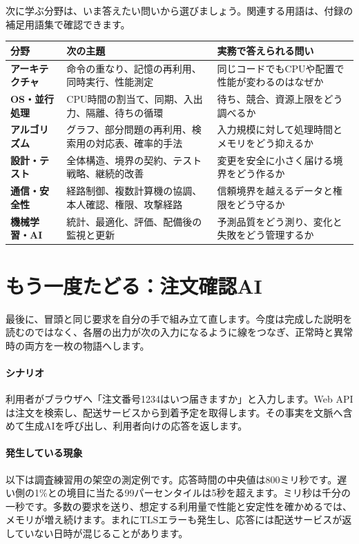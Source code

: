 次に学ぶ分野は、いま答えたい問いから選びましょう。関連する用語は、付録の補足用語集で確認できます。

\begingroup
  \noindent
  \begin{tabularx}{\textwidth}{@{}>{\bfseries}p{30mm}YY@{}}
    \toprule
    分野 & 次の主題 & 実務で答えられる問い \\
    \midrule
    アーキテクチャ & 命令の重なり、記憶の再利用、同時実行、性能測定 & 同じコードでもCPUや配置で性能が変わるのはなぜか \\
    OS・並行処理 & CPU時間の割当て、同期、入出力、隔離、待ちの循環 & 待ち、競合、資源上限をどう調べるか \\
    アルゴリズム & グラフ、部分問題の再利用、検索用の対応表、確率的手法 & 入力規模に対して処理時間とメモリをどう抑えるか \\
    設計・テスト & 全体構造、境界の契約、テスト戦略、継続的改善 & 変更を安全に小さく届ける境界をどう作るか \\
    通信・安全性 & 経路制御、複数計算機の協調、本人確認、権限、攻撃経路 & 信頼境界を越えるデータと権限をどう守るか \\
    機械学習・AI & 統計、最適化、評価、配備後の監視と更新 & 予測品質をどう測り、変化と失敗をどう管理するか \\
    \bottomrule
  \end{tabularx}
  \vspace{1mm}
\par
\endgroup


\section{もう一度たどる：注文確認AI}
\label{sec:07-practice-15}

最後に、冒頭と同じ要求を自分の手で組み立て直します。今度は完成した説明を読むのではなく、各層の出力が次の入力になるように線をつなぎ、正常時と異常時の両方を一枚の物語へします。

\begingroup
\begingroup
\paragraph{シナリオ}
        利用者がブラウザへ「注文番号1234はいつ届きますか」と入力します。Web APIは注文を検索し、配送サービスから到着予定を取得します。その事実を文脈へ含めて生成AIを呼び出し、利用者向けの応答を返します。

\paragraph{発生している現象}
        以下は調査練習用の架空の測定例です。応答時間の中央値は800ミリ秒です。遅い側の1\%との境目に当たる99パーセンタイルは5秒を超えます。ミリ秒は千分の一秒です。多数の要求を送り、想定する利用量で性能と安定性を確かめるでは、メモリが増え続けます。まれにTLSエラーも発生し、応答には配送サービスが返していない日時が混じることがあります。

